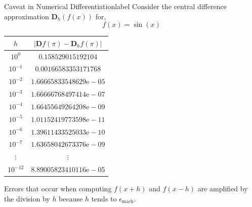     \begin{ex}{Caveat in Numerical Differentiation}{label}
        Consider the central difference approximation $\mathbf{D}_h (f(x))$ for,
        \[f(x) = \sin(x)\]

        \begin{center}
            \begin{tabular}{|c|c|}
            \hline$h$ & $\left|\mathbf{D} f(\pi)-\mathbf{D}_h f(\pi)\right|$ \\
            \hline $10^0$ & $0.158529015192104$ \\
            $10^{-1}$ & $0.00166583353171768$ \\
            $10^{-2}$ & $1.66665833548629 \mathrm{e}-05$ \\
            $10^{-3}$ & $1.66666768497414 \mathrm{e}-07$ \\
            $10^{-4}$ & $1.66455649264208 \mathrm{e}-09$ \\
            $10^{-5}$ & $1.01152419773598 \mathrm{e}-11$ \\
            $10^{-6}$ & $1.39611433525033 \mathrm{e}-10$ \\
            $10^{-7}$ & $1.63658042673376 \mathrm{e}-09$ \\
            $\vdots$ & $\vdots$ \\
            $10^{-12}$ & $8.89005823410116 \mathrm{e}-05$ \\
            \hline
            \end{tabular}
        \end{center}

        \NewLine 
        
        Errors that occur when computing $f(x + h)$ and $f(x-h)$ are amplified by the division by $h$ because $h$ tends to $\epsilon_{\operatorname{mach}}$.
    \end{ex}

